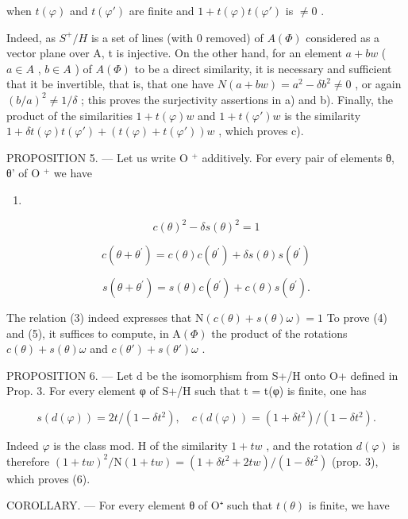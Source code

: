 when \(t(\varphi)\) and \(t(\varphi')\) are finite and \(1 + t(\varphi)t(\varphi')\) is \(\neq 0\) .

Indeed, as \(S^{+}/H\) is a set of lines (with 0 removed) of \(A(\Phi)\) considered as a vector plane over A, t is injective. On the other hand, for an element \(a + bw\) ( \(a \in A\) , \(b \in A\) ) of \(A(\Phi)\) to be a direct similarity, it is necessary and sufficient that it be invertible, that is, that one have \(N(a + bw) = a^{2} - \delta b^{2} \neq 0\) , or again \((b/a)^{2} \neq 1/\delta\) ; this proves the surjectivity assertions in a) and b). Finally, the product of the similarities \(1 + t(\varphi)w\) and \(1 + t(\varphi')w\) is the similarity \(1 + \delta t(\varphi)t(\varphi') + (t(\varphi) + t(\varphi'))w\) , which proves c).

PROPOSITION 5. --- Let us write O \(^{+}\) additively. For every pair of elements θ, θ' of O \(^{+}\) we have

\begin{enumerate}
\def\labelenumi{(\arabic{enumi})}
\setcounter{enumi}{2}
\tightlist
\item
\end{enumerate}

\[
c (\theta) ^ {2} - \delta s (\theta) ^ {2} = 1\tag{4}
\]

\[
c (\theta + \theta^ {\prime}) = c (\theta) c (\theta^ {\prime}) + \delta s (\theta) s (\theta^ {\prime})\tag{5}
\]

\[
s (\theta + \theta^ {\prime}) = s (\theta) c (\theta^ {\prime}) + c (\theta) s (\theta^ {\prime}).
\]

The relation (3) indeed expresses that \(\mathrm{N}(c(\theta)+s(\theta)\omega)=1\) To prove (4) and (5), it suffices to compute, in \(\mathrm{A}(\Phi)\) the product of the rotations \(c(\theta)+s(\theta)\omega\) and \(c(\theta')+s(\theta')\omega\) .

PROPOSITION 6. — Let d be the isomorphism from S+/H onto O+ defined in Prop. 3. For every element φ of S+/H such that t = t(φ) is finite, one has

\[
s (d (\varphi)) = 2 t / (1 - \delta t ^ {2}), \quad c (d (\varphi)) = (1 + \delta t ^ {2}) / (1 - \delta t ^ {2}).\tag{6}
\]

Indeed \(\varphi\) is the class mod. H of the similarity \(1 + tw\) , and the rotation \(d(\varphi)\) is therefore \((1 + tw)^2/\mathrm{N}(1 + tw) = (1 + \delta t^2 + 2tw)/(1 - \delta t^2)\) (prop. 3), which proves (6).

COROLLARY. --- For every element θ of O⁺ such that \(t(\theta)\) is finite, we have

